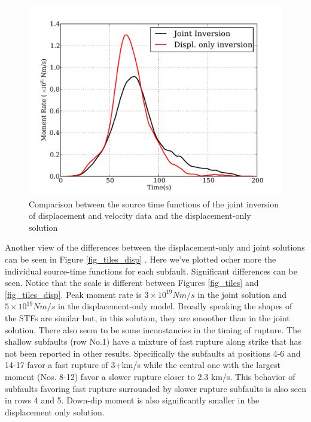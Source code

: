 \begin{figure}[!ht] 
  \centering
  \includegraphics[width=0.72\linewidth]{./figures/ch4/source_TF_compare.pdf}
    \caption[Source time function comparisons]{Comparison between the source time functions of the joint inversion of displacement and velocity data and the displacement-only solution}
  \label{fig_stf_compare}
\end{figure}

Another view of the differences between the displacement-only and joint solutions can be seen in Figure \ref{fig_tiles_disp} . Here we've plotted ocher more the individual source-time functions for each subfault. Significant differences can be seen. Notice that the scale is different between Figures \ref{fig_tiles} and \ref{fig_tiles_disp}. Peak moment rate is $3\times10^{19}Nm/s$ in the joint solution and $5\times10^{19}Nm/s$ in the displacement-only model. Broadly speaking the shapes of the STFs are similar but, in this solution, they are smoother than in the joint solution. There also seem to be some inconstancies in the timing of rupture. The shallow subfaults (row No.1) have a mixture of fast rupture along strike that has not been reported in other results. Specifically the subfaults at positions 4-6 and 14-17 favor a fast rupture of 3+km/s while the central one with the largest moment (Nos. 8-12) favor a slower rupture closer to 2.3 km/s. This behavior of subfaults favoring fast rupture surrounded by slower rupture subfaults is also seen in rows 4 and 5. Down-dip moment is also significantly smaller in the displacement only solution.

